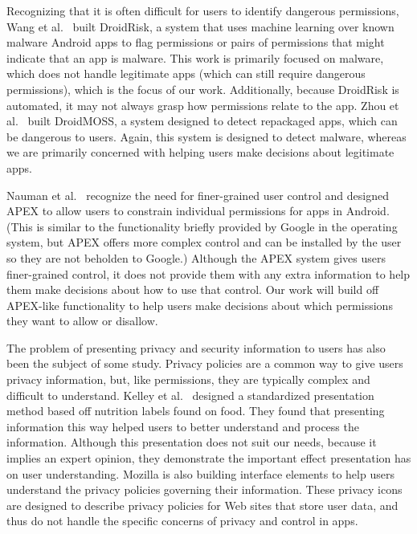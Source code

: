 \documentclass[11pt]{article}
\begin{document}
Recognizing that it is often difficult for users to identify dangerous
permissions, Wang et al.\ \cite{droidrisk-2013} built DroidRisk, a system that uses machine 
learning over known malware Android apps to flag permissions or 
pairs of permissions that might indicate that an app is malware. 
This work is primarily focused on malware, which does not handle legitimate 
apps (which can still require dangerous permissions), which is the focus of our work. 
Additionally, because DroidRisk is automated, 
it may not always grasp how permissions relate to the app.
Zhou et al.\ \cite{android-repackaged-CODASPY12} built DroidMOSS, a system 
designed to detect repackaged apps, which can be dangerous to users.
Again, this system is designed to detect malware, whereas we are primarily 
concerned with helping users make decisions about legitimate apps. 

Nauman et al.\ \cite{apex-ASIACCS10} recognize the need for finer-grained user control and
designed APEX to allow users to constrain individual permissions for apps in
Android. (This is similar to the functionality briefly provided by Google in the 
operating system, but APEX offers more complex control and can be 
installed by the user so they are not beholden to Google.) Although the APEX system 
gives users finer-grained control, it does not provide them with any extra
information to help them make decisions about how to use that control. Our 
work will build off APEX-like functionality to help users
make decisions about which permissions they want to allow or disallow.

The problem of presenting privacy and security information to users has
also been the subject of some study. Privacy policies are a common way to
give users privacy information, but, like permissions, they are typically 
complex and difficult to understand. Kelley et al.\ \cite{nutrition-labels-SOUPS09}
designed a standardized presentation method based off nutrition labels found on food. 
They found that presenting information this way helped users to better understand 
and process the information. Although this 
presentation does not suit our needs, because it implies an expert opinion, they
demonstrate the important effect presentation has on user understanding. Mozilla
\cite{moz-privacy-icons}
is also building interface elements to help users understand the privacy policies
governing their information. These privacy icons are designed to describe privacy
policies for Web sites that store user data, and thus do not handle the
specific concerns of privacy and control in apps.
\end{document}
